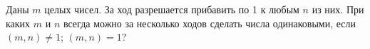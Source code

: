 \documentclass[12pt,a4paper]{article}
\begin{document}
Даны $m$ целых чисел. За ход разрешается прибавить
по 1 к любым $n$ из них. При каких $m$ и $n$ всегда можно
за несколько ходов сделать числа одинаковыми, если
 $(m,n)\ne1$;
 $(m,n)=1$?


















\end{document}
